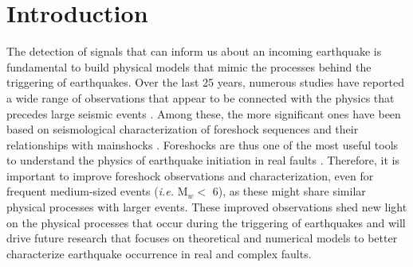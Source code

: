 \documentclass[a4paper,12pt,twoside]{article}
\begin{document}
\section*{Introduction}

The detection of signals that can inform us about an incoming earthquake is fundamental to build physical models that mimic the processes behind the triggering of earthquakes. Over the last 25 years, numerous studies have reported a wide range of observations that appear to be connected with the physics that precedes large seismic events \citep[\emph{e.g.}][]{Rikitake_1975_EP, Jones_1979_SCF, Molchanov_1998_PES, Eftaxias_2000_DEE, Virk_2001_HRP, Singh_2010_PSU, DeSantins_2019_PWS, Jones_1985_FTE, Abercrombie_1996_OPF, Felzer_2004_COA, Dodge_1996_DOC, Ellsworth_2018_NIE, Yoon_2019_FMN, Reasenberg_1999_FOB, ruiz2017nucleation, ruiz2014intense}. Among these, the more significant ones have been based on seismological characterization of foreshock sequences and their relationships with mainshocks \citep[\emph{e.g.}][]{Jones_1985_FTE, Abercrombie_1996_OPF, Reasenberg_1999_FOB, Felzer_2004_COA, Dodge_1996_DOC, Ellsworth_2018_NIE, Yoon_2019_FMN, ruiz2017nucleation}. Foreshocks are thus one of the most useful tools to understand the physics of earthquake initiation in real faults \citep{Brune_1979_IET, Abercrombie_1996_OPF, Malin_2018_MPE}. Therefore, it is important to improve foreshock observations and characterization, even for frequent medium-sized events (\emph{i.e.} M$_w <$ 6), as these might share similar physical processes with larger events. These improved observations shed new light on the physical processes that occur during the triggering of earthquakes and will drive future research that focuses on theoretical and numerical models to better characterize earthquake occurrence in real and complex faults. 
\end{document}

